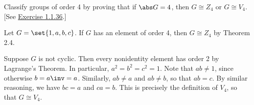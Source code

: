 \begin{exercise}\label{ex2.5.10}
    Classify groups of order 4 by proving that if $\abs G = 4$, then $G \cong Z_4$ or $G \cong V_4$. [See \hyperref[ex1.1.36]{Exercise 1.1.36}.]
\end{exercise}

\begin{sol}
    Let $G = \set{1, a, b, c}$.  If $G$ has an element of order 4, then $G \cong Z_4$ by Theorem 2.4.

    Suppose $G$ is not cyclic. Then every nonidentity element has order 2 by Lagrange's Theorem. In particular, $a^2 = b^2 = c^2 = 1$. Note that $ab \neq 1$, since otherwise $b = a\inv = a$. Similarly, $ab \neq a$ and $ab \neq b$, so that $ab = c$. By similar reasoning, we have $bc = a$ and $ca = b$. This is precisely the definition of $V_4$, so that $G \cong V_4$.
\end{sol}


